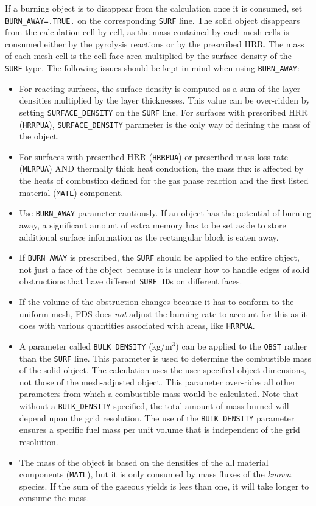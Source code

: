 \documentclass[11pt]{book}
\newcommand{\ct}{\tt\small}
\begin{document}
If a burning object is to disappear from the calculation once it is consumed, set {\ct BURN\_AWAY=.TRUE.} on the corresponding
{\ct SURF} line. The solid object disappears from the calculation cell by cell, as the mass contained by each mesh cells is consumed
either by the pyrolysis reactions or by the prescribed HRR.  The mass of each mesh cell is the cell face area multiplied by the
surface density of the {\ct SURF} type.
The following issues should be kept in mind when using {\ct BURN\_AWAY}:
\begin{itemize}
\item  For reacting surfaces, the surface density is computed as a sum of the layer densities multiplied by the layer thicknesses.
This value can be over-ridden by setting {\ct SURFACE\_DENSITY} on the {\ct SURF} line. For surfaces with prescribed HRR
({\ct HRRPUA}), {\ct SURFACE\_DENSITY} parameter is the only way of defining the mass of the object.
\item For surfaces with prescribed HRR ({\ct HRRPUA}) or prescribed mass loss rate ({\ct MLRPUA}) AND thermally thick heat conduction,
the mass flux is affected by the heats of combustion defined for the gas phase reaction and the first listed material ({\ct MATL}) component.
\item Use {\ct BURN\_AWAY} parameter cautiously. If an object has the potential of burning away, a significant
amount of extra memory has to be set aside to store additional surface information as the rectangular block is
eaten away.
\item If {\ct BURN\_AWAY} is prescribed, the {\ct SURF} should be applied to the entire object, not just a face of the object
because it is unclear how to handle edges of solid obstructions that have different {\ct SURF\_ID}s on different faces.
\item If the volume of the obstruction changes because it has to conform to the uniform mesh,
FDS does {\em not} adjust the burning rate to account for this as it does with various quantities associated with areas,
like {\ct HRRPUA}.
\item A parameter called {\ct BULK\_DENSITY} (kg/m$^3$) can be applied to the {\ct OBST} rather than the {\ct SURF} line. This parameter is used
to determine the combustible mass of the solid object. The calculation uses the user-specified object dimensions, not those of the mesh-adjusted
object. This parameter over-rides all other parameters from which a combustible mass would be calculated. Note that without a {\ct BULK\_DENSITY} specified, the total amount of mass burned will depend upon the grid resolution. The use of the {\ct BULK\_DENSITY} parameter ensures a specific fuel mass per unit volume that is independent of the grid resolution.
\item The mass of the object is based on the densities of the all material components ({\ct MATL}), but it is only consumed by mass fluxes of
the {\em known} species. If the sum of the gaseous yields is less than one, it will take longer to consume the mass.
\end{itemize}
\end{document}
